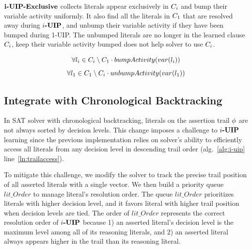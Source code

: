 \documentclass[runningheads]{llncs}
\begin{document}
$\textbf{i-UIP-Exclusive}$ collects literals appear exclusively in $C_{i}$ and
bump their variable activity uniformly. It also find all the literals
in $C_{1}$ that are resolved away during $\textbf{$i$-UIP}$, and unbump
their variable activity if they have been bumped during 1-UIP. The
unbumped literals are no longer in the learned clause $C_{i}$,
keep their variable activity bumped does not help solver to use
$C_{i}$.

\[ \forall l_{i} \in  C_{i} \setminus C_{1} \cdot bumpActivity(var(l_{i})) 
\]
\[ \forall l_{1} \in  C_{1} \setminus C_{i} \cdot unbumpActivity(var(l_{1})) 
\]


\subsection{Integrate with Chronological Backtracking}
In SAT solver with chronological backtracking, literals on the
assertion trail $\phi$ are not always sorted by decision
levels. This change imposes a challenge to $\textbf{$i$-UIP}$ learning since the
previous implementation relies on solver's ability to efficiently
access all literals from any decision level in descending trail order
(alg.~\ref{alg:i-uip} line~\ref{ln:trailaccess}).

To mitigate this challenge, we modify the solver to track the precise
trail position of all asserted literals with a single vector. We then
build a priority queue $lit\_Order$ to manage literal's resolution
order. The queue $lit\_Order$ prioritizes literals with higher
decision level, and it favors literal with higher trail position when
decision levels are tied. The order of $lit\_Order$ represents the
correct resolution order of $\textbf{$i$-UIP}$ because 1) an asserted literal's
decision level is the maximum level among all of its reasoning
literals, and 2) an asserted literal always appears higher in the
trail than its reasoning literal.
\end{document}
